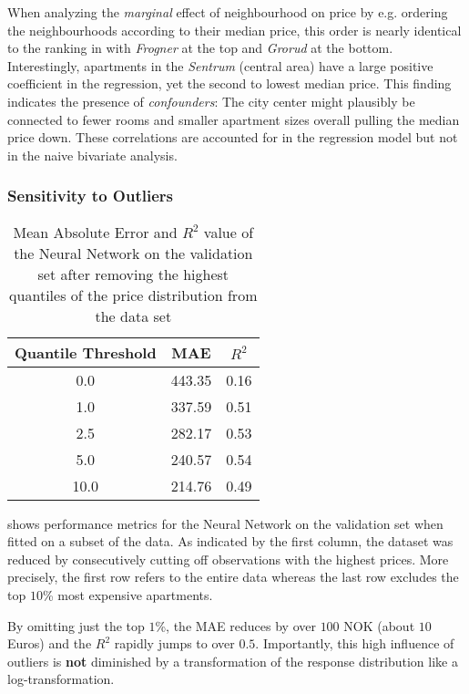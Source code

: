 When analyzing the \emph{marginal} effect of neighbourhood on price by e.g. ordering the neighbourhoods according to their median price, this order is nearly identical to the ranking in  with \emph{Frogner} at the top and \emph{Grorud} at the bottom.
Interestingly, apartments in the \emph{Sentrum} (central area) have a large positive coefficient in the regression, yet the second to lowest median price.
This finding indicates the presence of \emph{confounders}:
The city center might plausibly be connected to fewer rooms and smaller apartment sizes overall pulling the median price down.
These correlations are accounted for in the regression model but not in the naive bivariate analysis.


\subsubsection{Sensitivity to Outliers} \label{outliers}

\begin{table}[t]
  \centering
  \begin{tabular}{@{}ccc@{}}
    \toprule
    Quantile Threshold & MAE    & $R^2$ \\ \midrule
    0.0                & 443.35 & 0.16  \\
    1.0                & 337.59 & 0.51  \\
    2.5                & 282.17 & 0.53  \\
    5.0                & 240.57 & 0.54  \\
    10.0               & 214.76 & 0.49  \\ \bottomrule
  \end{tabular}
  \caption{Mean Absolute Error and $R^2$ value of the Neural Network on the validation set after removing the highest quantiles of the price distribution from the data set}
  \label{tab:mlp-outliers}
\end{table}

 shows performance metrics for the Neural Network on the validation set when fitted on a subset of the data.
As indicated by the first column, the dataset was reduced by consecutively cutting off observations with the highest prices.
More precisely, the first row refers to the entire data whereas the last row excludes the top $10$\% most expensive apartments.

By omitting just the top $1$\%, the MAE reduces by over $100$ NOK (about $10$ Euros) and the $R^2$ rapidly jumps to over $0.5$.
Importantly, this high influence of outliers is \textbf{not} diminished by a transformation of the response distribution like a log-transformation.

